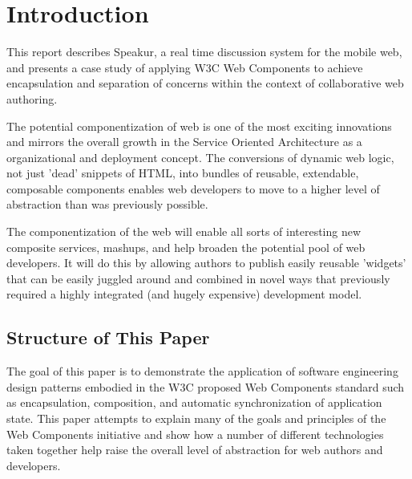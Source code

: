 \chapter{Introduction}
%

%
%

This report describes Speakur, a real time discussion system for the mobile web, and 
presents a case study of applying W3C Web Components 
to achieve encapsulation and separation of concerns within the context of 
collaborative web authoring. 

The potential componentization of web is one of the most exciting innovations and mirrors the overall growth in the Service Oriented Architecture 
as a organizational and deployment concept. 
The conversions of dynamic web logic, not just 'dead' snippets of HTML, into bundles of reusable, extendable, composable components enables web developers to move to a higher level of abstraction than was previously possible.

The componentization of the web will enable all sorts of interesting new composite services, mashups, and help broaden the potential pool of web developers. 
It will do this by allowing authors to publish easily reusable 'widgets' that can be easily juggled around and combined in novel ways that previously required a highly integrated (and hugely expensive) development model.

\section{Structure of This Paper}
%

The goal of this paper is to demonstrate the application of software engineering design patterns embodied in the  W3C proposed Web Components standard such as encapsulation, composition, and
automatic synchronization of application state. 
This paper attempts to explain many of the goals and principles of the Web Components initiative and show how a number of different technologies taken together help raise the overall level of abstraction for web authors and developers.


